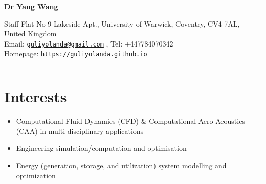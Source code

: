 \documentclass[letterpaper]{article}
\def\name{Dr Yang Wang}
\begin{document}

\centerline{\LARGE \bf \name}


\begin{minipage}{\linewidth}
\begin{center}
Staff Flat No 9 Lakeside Apt., University of Warwick, Coventry, CV4 7AL, United Kingdom\\
Email: \href{mailto:guliyolanda@gmail.com}{\tt guliyolanda@gmail.com} , Tel: +447784070342 \\
Homepage:  \href{https://guliyolanda.github.io}{\tt https://guliyolanda.github.io} \\
\end{center}
\end{minipage}

\vspace{0pt}
\rule{\textwidth}{1pt}

\vspace{-12pt}
\section*{Interests}
\vspace{-10pt}
\begin{itemize}
\item Computational Fluid Dynamics (CFD) \& Computational Aero Acoustics (CAA) in multi-disciplinary applications
\item Engineering simulation/computation and optimisation
 \item Energy (generation, storage, and utilization) system modelling and optimization


\end{itemize}

\vspace{-12pt}
\end{document}
